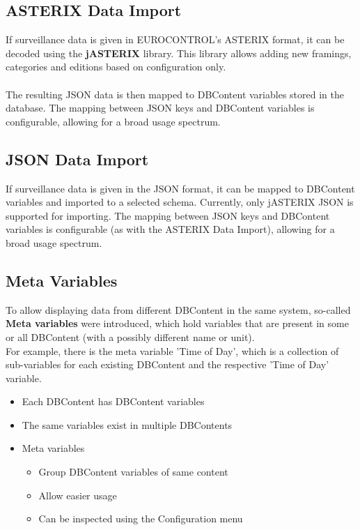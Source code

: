 \subsection*{ASTERIX Data Import}
If surveillance data is given in EUROCONTROL's ASTERIX format, it can be decoded using the \textbf{jASTERIX} library. This library allows adding new framings, categories and editions based on configuration only. \\\\

The resulting JSON data is then mapped to DBContent variables stored in the database. The mapping between JSON keys and DBContent variables is configurable, allowing for a broad usage spectrum.

\subsection*{JSON Data Import}
If surveillance data is given in the JSON format, it can be mapped to DBContent variables and imported to a selected schema. Currently, only jASTERIX JSON is supported for importing. The mapping between JSON keys and DBContent variables is configurable (as with the ASTERIX Data Import), allowing for a broad usage spectrum.

\subsection*{Meta Variables}

To allow displaying data from different DBContent in the same system, so-called \textbf{Meta variables} were introduced, which hold variables that are present in some or all DBContent (with a possibly different name or unit). \\
For example, there is the meta variable 'Time of Day', which is a collection of sub-variables for each existing DBContent and the respective 'Time of Day' variable. \\

\begin{itemize}
\item Each DBContent has DBContent variables
\item The same variables exist in multiple DBContents
\item Meta variables
\begin{itemize}
\item Group DBContent variables of same content
\item Allow easier usage
\item Can be inspected using the Configuration menu
\end{itemize}
\end{itemize}
\ \\

